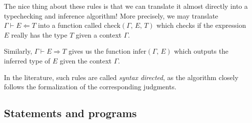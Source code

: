 \documentclass{article}
\begin{document}
The nice thing about these rules is that we can translate it almost directly
into a typechecking and inference algorithm!
More precisely, we may translate $\Gamma \vdash E \Leftarrow T$ into a
function called $\text{check}(\Gamma, \, E, \, T)$ which checks if the
expression $E$ really has the type $T$ given a context $\Gamma$.

Similarly, $\Gamma \vdash E \Rightarrow T$ gives us the function
$\text{infer}(\Gamma, \, E)$ which outputs the inferred type of $E$ given
the context $\Gamma$.

In the literature, such rules are called \textit{syntax directed}, as the
algorithm closely follows the formalization of the corresponding judgments.





\subsection{Statements and programs}
\begin{comment}
  Follows this approach:
  https://www.cs.cornell.edu/courses/cs6110/2013sp/lectures/lec05-sp13.pdf
\end{comment}
\end{document}
